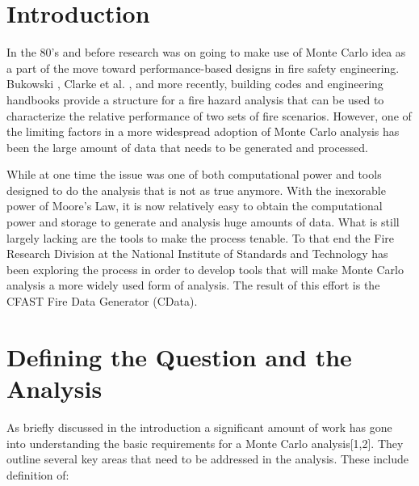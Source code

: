 \documentclass[12pt,twoside]{book}
\begin{document}
\cleardoublepage
\tableofcontents

\clearpage
\listoffigures


\mainmatter

%
%

\chapter{Introduction}

In the 80’s and before research was on going to make use of Monte Carlo idea as a part of the move toward performance-based designs in fire safety engineering. Bukowski \cite{Bukowski_1985}, Clarke et al. \cite{Clarke_1990}, and more recently, building codes \cite{NFPA_5000} and engineering handbooks \cite{Hurley_2016} provide a structure for a fire hazard analysis that can be used to characterize the relative performance of two sets of fire scenarios. However, one of the limiting factors in a more widespread adoption of Monte Carlo analysis has been the large amount of data that needs to be generated and processed.

While at one time the issue was one of both computational power and tools designed to do the analysis that is not as true anymore. With the inexorable power of Moore’s Law, it is now relatively easy to obtain the computational power and storage to generate and analysis huge amounts of data. What is still largely lacking are the tools to make the process tenable. To that end the Fire Research Division at the National Institute of Standards and Technology has been exploring the process \cite{NIST_TN_2041,Reneke_2017,Reneke_2018,Cleary_2019} in order to develop tools that will make Monte Carlo analysis a more widely used form of analysis. The result of this effort is the CFAST Fire Data Generator (CData).

%
%

\chapter{Defining the Question and the Analysis}

As briefly discussed in the introduction a significant amount of work has gone into understanding the basic requirements for a Monte Carlo analysis[1,2]. They outline several key areas that need to be addressed in the analysis.  These include definition of:
\end{document}
